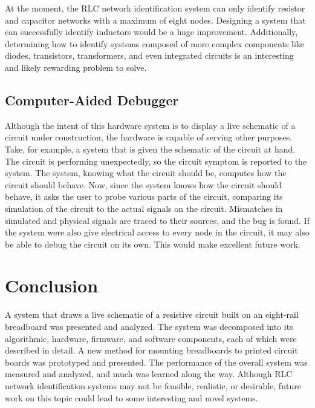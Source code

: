 \documentclass[11pt,twoside]{mitthesis}
\begin{document}
At the moment, the RLC network identification system can only identify resistor and capacitor networks with a maximum of eight nodes.
Designing a system that can successfully identify inductors would be a huge improvement.
Additionally, determining how to identify systems composed of more complex components like diodes, transistors, transformers, and even integrated circuits is an interesting and likely rewarding problem to solve.

\subsection{Computer-Aided Debugger}

Although the intent of this hardware system is to display a live schematic of a circuit under construction, the hardware is capable of serving other purposes.
Take, for example, a system that is given the schematic of the circuit at hand.
The circuit is performing unexpectedly, so the circuit symptom is reported to the system.
The system, knowing what the circuit should be, computes how the circuit should behave.
Now, since the system knows how the circuit should behave, it asks the user to probe various parts of the circuit, comparing its simulation of the circuit to the actual signals on the circuit.
Mismatches in simulated and physical signals are traced to their sources, and the bug is found.
If the system were also give electrical access to every node in the circuit, it may also be able to debug the circuit on its own.
This would make excellent future work.

\section{Conclusion}

A system that draws a live schematic of a resistive circuit built on an eight-rail breadboard was presented and analyzed.
The system was decomposed into its algorithmic, hardware, firmware, and software components, each of which were described in detail.
A new method for mounting breadboards to printed circuit boards was prototyped and presented.
The performance of the overall system was measured and analyzed, and much was learned along the way.
Although RLC network identification systems may not be feasible, realistic, or desirable, future work on this topic could lead to some interesting and novel systems.

\ifdefined\DEBUG
\end{document}
